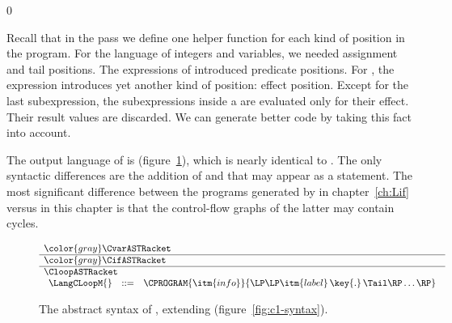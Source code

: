\documentclass[7x10]{TimesAPriori_MIT}%
\newcommand{\gray}[1]{{\color{gray} #1}}
\def\racketEd{0}
\def\edition{1}
\numberwithin{theorem}{chapter}
\numberwithin{definition}{chapter}
\numberwithin{equation}{chapter}
\begin{document}
{\if\edition\racketEd

Recall that in the  pass we define one helper
function for each kind of position in the program.  For the \LangVar{}
language of integers and variables, we needed assignment and tail
positions. The  expressions of \LangIf{} introduced predicate
positions. For \LangLoop{}, the  expression introduces yet
another kind of position: effect position. Except for the last
subexpression, the subexpressions inside a  are evaluated
only for their effect. Their result values are discarded. We can
generate better code by taking this fact into account.

The output language of  is \LangCLoop{}
(figure~\ref{fig:c7-syntax}), which is nearly identical to
\LangCIf{}. The only syntactic differences are the addition of \VOID{}
and that  may appear as a statement.  The most significant
difference between the programs generated by 
in chapter~\ref{ch:Lif} versus  in this
chapter is that the control-flow graphs of the latter may contain
cycles.

\begin{figure}[tp]
\begin{tcolorbox}[colback=white]    
\small
\[
\begin{array}{l}
  \gray{\CvarASTRacket} \\ \hline
  \gray{\CifASTRacket} \\ \hline
  \CloopASTRacket \\
\begin{array}{lcl}
\LangCLoopM{} & ::= & \CPROGRAM{\itm{info}}{\LP\LP\itm{label}\,\key{.}\,\Tail\RP\ldots\RP}
\end{array}
\end{array}
\]
\end{tcolorbox}

\caption{The abstract syntax of \LangCLoop{}, extending \LangCIf{} (figure~\ref{fig:c1-syntax}).}
\label{fig:c7-syntax}
\end{figure}

}
\end{document}
